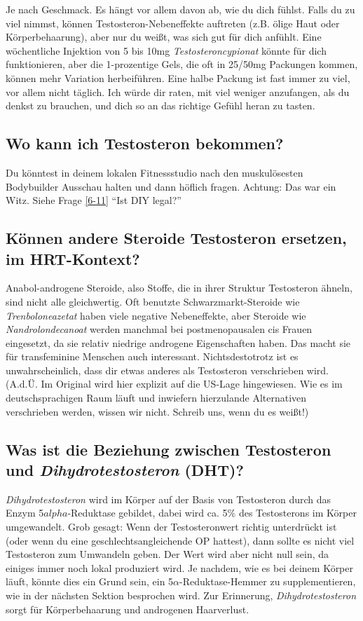 \documentclass{article}
\begin{document}
Je nach Geschmack. Es hängt vor allem davon ab, wie du dich fühlst. Falls du zu viel nimmst, können Testosteron-Nebeneffekte auftreten (z.B. ölige Haut oder Körperbehaarung), aber nur du weißt, was sich gut für dich anfühlt. Eine wöchentliche Injektion von 5 bis 10mg \textit{Testosteroncypionat} könnte für dich funktionieren, aber die 1-prozentige Gels, die oft in 25/50mg Packungen kommen, können mehr Variation herbeiführen. Eine halbe Packung ist fast immer zu viel, vor allem nicht täglich. Ich würde dir raten, mit viel weniger anzufangen, als du denkst zu brauchen, und dich so an das richtige Gefühl heran zu tasten.

\subsection{Wo kann ich Testosteron bekommen?}

Du könntest in deinem lokalen Fitnessstudio nach den muskulösesten Bodybuilder Ausschau halten und dann höflich fragen. Achtung: Das war ein Witz. Siehe Frage \ref{6-11} “Ist DIY legal?”

\subsection{Können andere Steroide Testosteron ersetzen, im HRT-Kontext?}

Anabol-androgene Steroide, also Stoffe, die in ihrer Struktur Testosteron ähneln, sind nicht alle gleichwertig. Oft benutzte Schwarzmarkt-Steroide wie \textit{Trenboloneazetat} haben viele negative Nebeneffekte, aber Steroide wie \textit{Nandrolondecanoat }werden manchmal bei postmenopausalen cis Frauen eingesetzt, da sie relativ niedrige androgene Eigenschaften haben. Das macht sie für transfeminine Menschen auch interessant. Nichtsdestotrotz ist es unwahrscheinlich, dass dir etwas anderes als Testosteron verschrieben wird. (A.d.Ü. Im Original wird hier explizit auf die US-Lage hingewiesen. Wie es im deutschsprachigen Raum läuft und inwiefern hierzulande Alternativen verschrieben werden, wissen wir nicht. Schreib uns, wenn du es weißt!)

\subsection{Was ist die Beziehung zwischen Testosteron und \textit{Dihydrotestosteron} (DHT)?}

\textit{Dihydrotestosteron} wird im Körper auf der Basis von Testosteron durch das Enzym 5$alpha$-Reduktase gebildet, dabei wird ca. 5\% des Testosterons im Körper umgewandelt. Grob gesagt: Wenn der Testosteronwert richtig unterdrückt ist (oder wenn du eine geschlechtsangleichende OP hattest), dann sollte es nicht viel Testosteron zum Umwandeln geben. Der Wert wird aber nicht null sein, da einiges immer noch lokal produziert wird. Je nachdem, wie es bei deinem Körper läuft, könnte dies ein Grund sein, ein 5$\alpha$-Reduktase-Hemmer zu supplementieren, wie in der nächsten Sektion besprochen wird. Zur Erinnerung, \textit{Dihydrotestosteron }sorgt für Körperbehaarung und androgenen Haarverlust.
\end{document}
